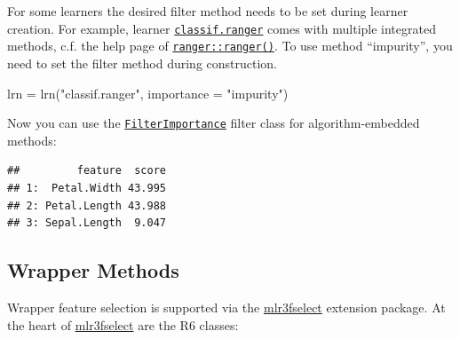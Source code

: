 \documentclass[
]{scrbook}
\newenvironment{Shaded}{\begin{snugshade}}{\end{snugshade}}
\newcommand{\AttributeTok}[1]{\textcolor[rgb]{0.77,0.63,0.00}{#1}}
\newcommand{\DecValTok}[1]{\textcolor[rgb]{0.00,0.00,0.81}{#1}}
\newcommand{\FunctionTok}[1]{\textcolor[rgb]{0.00,0.00,0.00}{#1}}
\newcommand{\NormalTok}[1]{#1}
\newcommand{\OtherTok}[1]{\textcolor[rgb]{0.56,0.35,0.01}{#1}}
\newcommand{\SpecialCharTok}[1]{\textcolor[rgb]{0.00,0.00,0.00}{#1}}
\newcommand{\StringTok}[1]{\textcolor[rgb]{0.31,0.60,0.02}{#1}}
\renewenvironment{Shaded} {\begin{snugshade}\small} {\end{snugshade}}
\begin{document}
For some learners the desired filter method needs to be set during learner creation.
For example, learner \href{https://mlr3learners.mlr-org.com/reference/mlr_learners_classif.ranger.html}{\texttt{classif.ranger}} comes with multiple integrated methods, c.f. the help page of \href{https://www.rdocumentation.org/packages/ranger/topics/ranger}{\texttt{ranger::ranger()}}.
To use method ``impurity'', you need to set the filter method during construction.

\begin{Shaded}
\begin{Highlighting}[]
\NormalTok{lrn }\OtherTok{=} \FunctionTok{lrn}\NormalTok{(}\StringTok{"classif.ranger"}\NormalTok{, }\AttributeTok{importance =} \StringTok{"impurity"}\NormalTok{)}
\end{Highlighting}
\end{Shaded}

Now you can use the \href{https://mlr3filters.mlr-org.com/reference/mlr_filters_importance.html}{\texttt{FilterImportance}} filter class for algorithm-embedded methods:

\begin{Shaded}
\end{Shaded}

\begin{verbatim}
##         feature  score
## 1:  Petal.Width 43.995
## 2: Petal.Length 43.988
## 3: Sepal.Length  9.047
\end{verbatim}

\hypertarget{fs-wrapper}{%
\subsection{Wrapper Methods}\label{fs-wrapper}}

Wrapper feature selection is supported via the \href{https://mlr3fselect.mlr-org.com}{mlr3fselect} extension package.
At the heart of \href{https://mlr3fselect.mlr-org.com}{mlr3fselect} are the R6 classes:
\end{document}
